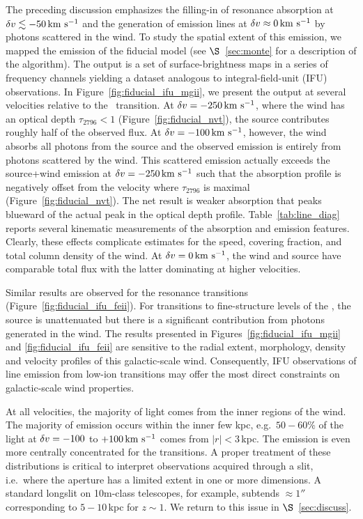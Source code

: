 \documentclass[12pt,preprint]{aastex}
\begin{document}
The preceding discussion emphasizes the filling-in of resonance
absorption at $\delta v
\lesssim -50 \, {\rm km~s^{-1}}$ and the generation of emission lines at $\delta v \approx
0 \, {\rm km~s^{-1}}$ by photons scattered in the wind.  To study the spatial
extent of this emission, we mapped the emission of the fiducial
model (see $\S$~\ref{sec:monte} for a description of the algorithm).
The output is a set of surface-brightness maps in a series of 
frequency channels yielding a
dataset analogous to integral-field-unit (IFU) observations.  In
Figure~\ref{fig:fiducial_ifu_mgii}, we present the output 
at several velocities relative to the \mgiia\
transition. At $\delta v = -250 \, {\rm km~s^{-1}}$, where the wind has an optical
depth $\tau_{2796} < 1$ (Figure~\ref{fig:fiducial_nvt}),
the source contributes roughly half of the observed flux.  
At $\delta v=-100 \, {\rm km~s^{-1}}$, however, the
wind absorbs all photons from the source and the observed emission is
entirely from photons scattered by the wind.  This scattered emission
actually exceeds the source+wind emission at 
$\delta v = -250 \, {\rm km~s^{-1}}$ such that the absorption profile is
negatively offset from the velocity where $\tau_{2796}$ is maximal
(Figure~\ref{fig:fiducial_nvt}).
The net result is
weaker  absorption that peaks blueward of the actual peak in the
optical depth profile.  
Table~\ref{tab:line_diag} reports several kinematic measurements of
the absorption and emission features.
Clearly, these effects complicate estimates for the
speed, covering fraction, and total column density of the wind.  At
$\delta v = 0 \, {\rm km~s^{-1}}$, the wind and source have comparable total flux with the
latter dominating at higher velocities.  

Similar results are observed for the  resonance
transitions (Figure~\ref{fig:fiducial_ifu_feii}).
For transitions to fine-structure levels of the \aconfig, the source
is unattenuated but there is a significant contribution from photons
generated in the wind. 
The results presented in Figures~\ref{fig:fiducial_ifu_mgii} and
\ref{fig:fiducial_ifu_feii} are sensitive to the radial extent,
morphology, density and velocity profiles of this galactic-scale
wind.  Consequently, IFU observations of line emission from low-ion
transitions may offer the most direct constraints on galactic-scale
wind properties. 

At all velocities, the majority of light comes from the inner regions
of the wind. 
The majority of
 emission occurs within the inner few kpc, e.g.\ $50-60\%$
of the light at $\delta v=-100$ to $+100 \, {\rm km~s^{-1}}$
comes from $|r| < 3$\,kpc.
The emission
is even more centrally concentrated for the  transitions.
A proper treatment of these
distributions is critical to interpret observations
acquired through a slit, i.e.\ where the aperture has a limited extent
in one or more dimensions.  A standard longslit on 10m-class
telescopes, for example, subtends $\approx 1''$ corresponding to
$5-10$\,kpc for $z \sim 1$.    We return to this issue in
$\S$~\ref{sec:discuss}. 
\end{document}
